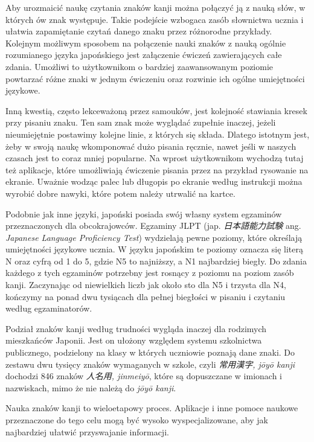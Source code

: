 \documentclass[a4paper,twoside,12pt]{book}
\newcommand{\obcy}[1]{\emph{#1}}
\newcommand{\english}[1]{{\selectlanguage{british}\obcy{#1}}}
\newcommand{\japanese}[1]{{\selectlanguage{japanese}\obcy{#1}}}
\begin{document}
Aby urozmaicić naukę czytania znaków kanji można połączyć ją z nauką słów, w których ów znak występuje. Takie podejście wzbogaca zasób słownictwa ucznia i ułatwia zapamiętanie czytań danego znaku przez różnorodne przykłady. Kolejnym możliwym sposobem na połączenie nauki znaków z nauką ogólnie rozumianego języka japońskiego jest załączenie ćwiczeń zawierających całe zdania. Umożliwi to użytkownikom o bardziej zaawansowanym poziomie powtarzać różne znaki w jednym ćwiczeniu oraz rozwinie ich ogólne umiejętności językowe. 

Inną kwestią, często lekceważoną przez samouków, jest kolejność stawiania kresek przy pisaniu znaku. Ten sam znak  może  wyglądać zupełnie inaczej, jeżeli nieumiejętnie postawimy kolejne linie, z których się składa. Dlatego istotnym jest, żeby w swoją naukę wkomponować dużo pisania ręcznie, nawet jeśli w naszych czasach jest to coraz mniej popularne. Na wprost użytkownikom wychodzą tutaj też aplikacje, które umożliwiają ćwiczenie pisania przez na przykład rysowanie na ekranie. Uważnie wodząc palec lub długopis po ekranie według instrukcji można wyrobić dobre nawyki, które potem należy utrwalić na kartce.

Podobnie jak inne języki, japoński posiada swój własny system egzaminów przeznaczonych dla obcokrajowców. Egzaminy JLPT (jap. \japanese{日本語能力試験} ang. \english{Japanese Language Proficiency Test}) wydzielają pewne poziomy, które określają umiejętności językowe ucznia. W języku japońskim te poziomy oznacza się literą N oraz cyfrą od 1 do 5, gdzie N5 to najniższy, a N1 najbardziej biegły. Do zdania każdego z tych egzaminów potrzebny jest rosnący z poziomu na poziom zasób kanji. Zaczynając od niewielkich liczb jak około sto dla N5 i trzysta dla N4, kończymy na ponad dwu tysiącach dla pełnej biegłości w pisaniu i czytaniu według egzaminatorów.

Podział znaków kanji według trudności wygląda inaczej dla rodzimych mieszkańców Japonii. Jest on ułożony względem systemu szkolnictwa publicznego, podzielony na klasy w których uczniowie poznają dane znaki. Do zestawu dwu tysięcy znaków wymaganych w szkole, czyli \japanese{常用漢字, jōyō kanji} dochodzi 846 znaków \japanese{人名用, jinmeiyō}, które są dopuszczane w imionach i nazwiskach, mimo że nie należą do \japanese{jōyō kanji}.

Nauka znaków kanji to wieloetapowy proces. Aplikacje i inne pomoce naukowe przeznaczone do tego celu mogą być wysoko wyspecjalizowane, aby jak najbardziej ułatwić przyswajanie informacji.
\end{document}
